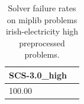 \begin{table}
\caption{Solver failure rates on miplib problems irish-electricity high preprocessed problems.}
\label{t-miplib problems irish-electricity high preprocessed-failure}
\begin{tabular}{lc}
\toprule
SCS-3.0_high \\
\midrule
100.00 \\
\bottomrule
\end{tabular}
\end{table}
